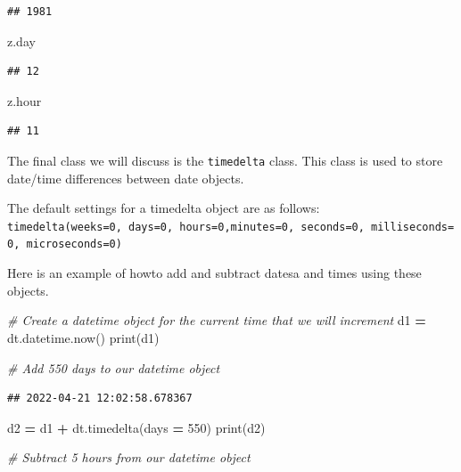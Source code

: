 \documentclass[
]{book}
\newenvironment{Shaded}{\begin{snugshade}}{\end{snugshade}}
\newcommand{\BuiltInTok}[1]{#1}
\newcommand{\CommentTok}[1]{\textcolor[rgb]{0.56,0.35,0.01}{\textit{#1}}}
\newcommand{\DecValTok}[1]{\textcolor[rgb]{0.00,0.00,0.81}{#1}}
\newcommand{\NormalTok}[1]{#1}
\newcommand{\OperatorTok}[1]{\textcolor[rgb]{0.81,0.36,0.00}{\textbf{#1}}}
\begin{document}
\begin{verbatim}
## 1981
\end{verbatim}

\begin{Shaded}
\begin{Highlighting}[]
\NormalTok{z.day}
\end{Highlighting}
\end{Shaded}

\begin{verbatim}
## 12
\end{verbatim}

\begin{Shaded}
\begin{Highlighting}[]
\NormalTok{z.hour}
\end{Highlighting}
\end{Shaded}

\begin{verbatim}
## 11
\end{verbatim}

The final class we will discuss is the \texttt{timedelta} class. This class is used to store date/time differences between date objects.

The default settings for a timedelta object are as follows: \texttt{timedelta(weeks=0,\ days=0,\ hours=0,minutes=0,\ seconds=0,\ milliseconds=0,\ microseconds=0)}

Here is an example of howto add and subtract datesa and times using these objects.

\begin{Shaded}
\begin{Highlighting}[]
\CommentTok{\# Create a datetime object for the current time that we will increment}
\NormalTok{d1 }\OperatorTok{=}\NormalTok{ dt.datetime.now()}
\BuiltInTok{print}\NormalTok{(d1)}

\CommentTok{\# Add 550 days to our datetime object }
\end{Highlighting}
\end{Shaded}

\begin{verbatim}
## 2022-04-21 12:02:58.678367
\end{verbatim}

\begin{Shaded}
\begin{Highlighting}[]
\NormalTok{d2 }\OperatorTok{=}\NormalTok{ d1 }\OperatorTok{+}\NormalTok{ dt.timedelta(days }\OperatorTok{=} \DecValTok{550}\NormalTok{)}
\BuiltInTok{print}\NormalTok{(d2)}

\CommentTok{\# Subtract 5 hours from our datetime object }
\end{Highlighting}
\end{Shaded}
\end{document}
